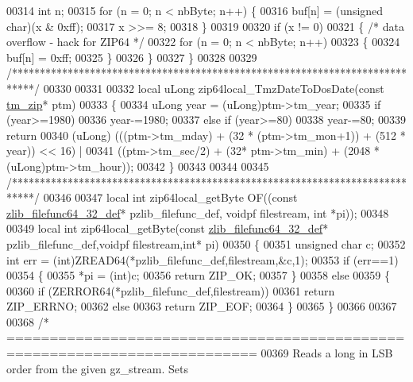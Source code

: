 \begin{DoxyCode}
00314     \textcolor{keywordtype}{int} n;
00315     \textcolor{keywordflow}{for} (n = 0; n < nbByte; n++) \{
00316         buf[n] = (\textcolor{keywordtype}{unsigned} char)(x & 0xff);
00317         x >>= 8;
00318     \}
00319 
00320     \textcolor{keywordflow}{if} (x != 0)
00321     \{     \textcolor{comment}{/* data overflow - hack for ZIP64 */}
00322        \textcolor{keywordflow}{for} (n = 0; n < nbByte; n++)
00323        \{
00324           buf[n] = 0xff;
00325        \}
00326     \}
00327 \}
00328 
00329 \textcolor{comment}{/****************************************************************************/}
00330 
00331 
00332 local uLong zip64local\_TmzDateToDosDate(\textcolor{keyword}{const} \hyperlink{structtm__zip__s}{tm\_zip}* ptm)
00333 \{
00334     uLong year = (uLong)ptm->tm\_year;
00335     if (year>=1980)
00336         year-=1980;
00337     \textcolor{keywordflow}{else} \textcolor{keywordflow}{if} (year>=80)
00338         year-=80;
00339     \textcolor{keywordflow}{return}
00340       (uLong) (((ptm->tm\_mday) + (32 * (ptm->tm\_mon+1)) + (512 * year)) << 16) |
00341         ((ptm->tm\_sec/2) + (32* ptm->tm\_min) + (2048 * (uLong)ptm->tm\_hour));
00342 \}
00343 
00344 
00345 \textcolor{comment}{/****************************************************************************/}
00346 
00347 local \textcolor{keywordtype}{int} zip64local\_getByte OF((\textcolor{keyword}{const} \hyperlink{structzlib__filefunc64__32__def__s}{zlib\_filefunc64\_32\_def}* pzlib\_filefunc\_def, 
      voidpf filestream, \textcolor{keywordtype}{int} *pi));
00348 
00349 local \textcolor{keywordtype}{int} zip64local\_getByte(\textcolor{keyword}{const} \hyperlink{structzlib__filefunc64__32__def__s}{zlib\_filefunc64\_32\_def}* pzlib\_filefunc\_def,voidpf 
      filestream,\textcolor{keywordtype}{int}* pi)
00350 \{
00351     \textcolor{keywordtype}{unsigned} \textcolor{keywordtype}{char} c;
00352     \textcolor{keywordtype}{int} err = (int)ZREAD64(*pzlib\_filefunc\_def,filestream,&c,1);
00353     \textcolor{keywordflow}{if} (err==1)
00354     \{
00355         *pi = (int)c;
00356         \textcolor{keywordflow}{return} ZIP\_OK;
00357     \}
00358     \textcolor{keywordflow}{else}
00359     \{
00360         \textcolor{keywordflow}{if} (ZERROR64(*pzlib\_filefunc\_def,filestream))
00361             \textcolor{keywordflow}{return} ZIP\_ERRNO;
00362         \textcolor{keywordflow}{else}
00363             \textcolor{keywordflow}{return} ZIP\_EOF;
00364     \}
00365 \}
00366 
00367 
00368 \textcolor{comment}{/* ===========================================================================}
00369 \textcolor{comment}{   Reads a long in LSB order from the given gz\_stream. Sets}

\end{DoxyCode}
